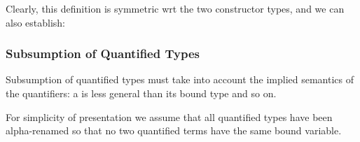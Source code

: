 \begin{itemize}
Clearly, this definition is symmetric wrt the two constructor types, and we can also establish:
\begin{prooftree}
\end{prooftree}

\end{itemize}

\subsubsection{Subsumption of Quantified Types}
Subsumption of quantified types must take into account the implied semantics of the quantifiers: a  is less general than its bound type and so on.

For simplicity of presentation we assume that all quantified types have been alpha-renamed so that no two quantified terms have the same bound variable.

